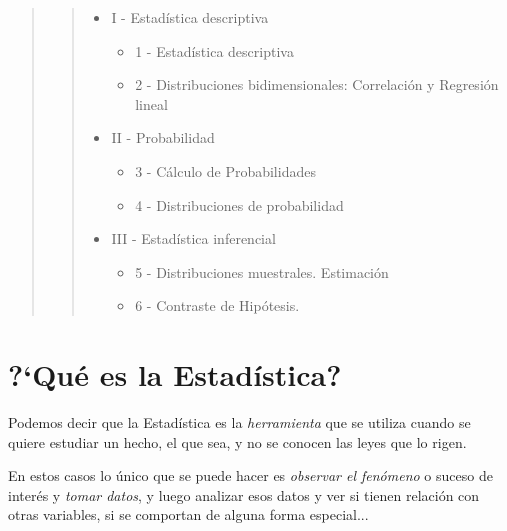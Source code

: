 \vspace{2 cm}

\begin{quotation} \begin{quotation}
\noindent 
\begin{large}
\begin{itemize}
\item I - Estadística descriptiva
	\begin{itemize}
	\item 1 - Estadística descriptiva
	\item 2 - Distribuciones bidimensionales: Correlación y Regresión lineal
	\end{itemize}
\item II - Probabilidad
	\begin{itemize}	
	\item 3 - Cálculo de Probabilidades
	\item 4 - Distribuciones de probabilidad
	\end{itemize}
\item III - Estadística inferencial
	\begin{itemize}
	\item 5 - Distribuciones muestrales. Estimación
	\item 6 - Contraste de Hipótesis. 
	\end{itemize}
\end{itemize}
\end{large}
\end{quotation} \end{quotation}

\newpage %


\section{?`Qué es la Estadística?}


Podemos decir que la Estadística es la \emph{herramienta} que se utiliza cuando se quiere estudiar un hecho, el que sea, y no se conocen las leyes que lo rigen. 

En estos casos lo único que se puede hacer es \emph{observar el fenómeno} o suceso de interés y \emph{tomar datos}, y luego analizar esos datos y ver si tienen relación con otras variables, si se comportan de alguna forma especial... 

